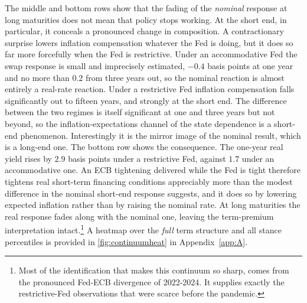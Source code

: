 The middle and bottom rows show that the fading of the \textit{nominal} response at long maturities does not mean that policy stops working. At the short end, in particular, it conceals a pronounced change in composition. A contractionary surprise lowers inflation compensation whatever the Fed is doing, but it does so far more forcefully when the Fed is restrictive. Under an accommodative Fed the swap response is small and imprecisely estimated, $-0.4$ basis points at one year and no more than $0.2$ from three years out, so the nominal reaction is almost entirely a real-rate reaction. Under a restrictive Fed inflation compensation falls significantly out to fifteen years, and strongly at the short end. The difference between the two regimes is itself significant at one and three years but not beyond, so the inflation-expectations channel of the state dependence is a short-end phenomenon. Interestingly it is the mirror image of the nominal result, which is a long-end one. The bottom row shows the consequence. The one-year real yield rises by $2.9$ basis points under a restrictive Fed, against $1.7$ under an accommodative one. An ECB tightening delivered while the Fed is tight therefore tightens real short-term financing conditions appreciably more than the modest difference in the nominal short-end response suggests, and it does so by lowering expected inflation rather than by raising the nominal rate. At long maturities the real response fades along with the nominal one, leaving the term-premium interpretation intact.\footnote{Most of the identification that makes this continuum so sharp, comes from the pronounced Fed-ECB divergence of 2022-2024. It supplies exactly the restrictive-Fed observations that were scarce before the pandemic. } A heatmap over the \textit{full} term structure and all stance percentiles is provided in \autoref{fig:continuumheat} in Appendix~\ref{app:A}.






